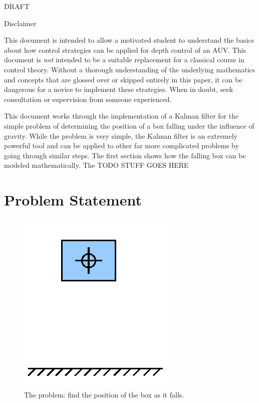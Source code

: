 \documentclass{article}
\begin{document}
\maketitle

\begin{center}
\Huge 
DRAFT
\normalsize
\end{center}
\vspace{4cm}

Disclaimer

This document is intended to allow a motivated student to understand the basics about how control strategies can be applied for depth control of an AUV.  This document is \emph{not} intended to be a suitable replacement for a classical course in control theory.  Without a thorough understanding of the underlying mathematics and concepts that are glossed over or skipped entirely in this paper, it can be dangerous for a novice to implement these strategies.  When in doubt, seek consultation or supervision from someone experienced.

\newpage

This document works through the implementation of a Kalman filter for the simple problem of determining the position of a box falling under the influence of gravity.  While the problem is very simple, the Kalman filter is an extremely powerful tool and can be applied to other far more complicated problems by going through similar steps.  The first section shows how the falling box can be modeled mathematically.  The TODO STUFF GOES HERE


\section{Problem Statement}


\begin{figure}[h]
\includegraphics[scale=0.25]{boxPicture.png}
\centering
\caption{The problem: find the position of the box as it falls.}
\label{fig:boxPic}
\end{figure}
\end{document}
